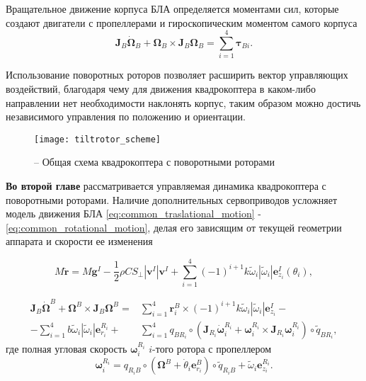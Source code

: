 Вращательное движение корпуса БЛА определяется моментами сил, которые создают двигатели с пропеллерами и гироскопическим моментом самого корпуса
\begin{equation} \label{eq:common_rotational_motion}
\bm{J}_B\dot{\bm{\Omega}}_B + \bm{\Omega}_B \times  \bm{J}_B{\bm{\Omega}_B} = \sum_{i=1}^{4}{\bm{\tau}_{Bi}}.
\end{equation}

Использование поворотных роторов позволяет расширить вектор управляющих воздействий, благодаря чему для движения квадрокоптера в каком-либо направлении нет необходимости наклонять корпус, таким образом можно достичь независимого управления по положению и ориентации.

\begin{figure}[H]
	\centering
	\texttt{[image: tiltrotor\_scheme]}
	\caption{ -- Общая схема квадрокоптера с поворотными роторами}
	\label{fig:tiltrotor_scheme}
\end{figure}

\textbf{Во второй главе} рассматривается управляемая динамика квадрокоптера с поворотными роторами. Наличие дополнительных сервоприводов усложняет модель движения БЛА \eqref{eq:common_traslational_motion} - \eqref{eq:common_rotational_motion}, делая его зависящим от текущей геометрии аппарата и скорости ее изменения

\begin{equation} \label{eq:m_traslational_motion}
M \ddot{\bm{r}} = M \bm{g}^I - \frac{1}{2} \rho C S_{\perp} |\bm{v}^I| \bm{v}^I + \sum_{i=1}^{4}{ { (-1)^{i+1} k \tilde \omega_i |\tilde \omega_i| \bm{e}^I_{z_i}}(\theta_i)},
\end{equation}

\begin{equation} \label{eq:m_final_rotational_motion}
\begin{aligned}
\bm{J}_B\dot{\bm{\Omega}}^B + \bm{\Omega}^B \times \bm{J}_B{\bm{\Omega}^B} =
&\sum_{i=1}^{4} {\bm{r}^B_i \times
	(-1)^{i+1} k \tilde \omega_i |\tilde \omega_i| \bm{e}^I_{z_i}} - \\
-\sum_{i=1}^{4} {b \tilde \omega_i |\tilde \omega_i| \bm e^{R_i}_{r_i}} +
&\sum_{i=1}^{4} q_{ B {R_i}} \circ (\bm{J}_{R_i}\dot{\bm{\omega}}^{R_i}_i + \bm{\omega}^{R_i}_i \times \bm{J}_{R_i}{\bm{\omega}^{R_i}_i}) \circ \tilde q_{ B {R_i}}
,
\end{aligned}
\end{equation}
где полная угловая скорость $\bm{\omega}^{R_i}_i$ $i$-того ротора с пропеллером
\begin{equation} \label{eq:m_prop_ang_vel}
\bm{\omega}^{R_i}_i =
q_{{R_i} B} \circ (\bm{\Omega}^B + \dot {\theta}_i \bm e^B_{r_i}) \circ \tilde {q}_{{R_i}B} +
\tilde \omega_i \bm{e}^{R_i}_{z_i}
.
\end{equation}

